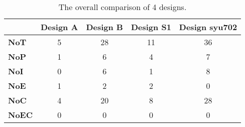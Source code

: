 \begin{table}[H]
	\renewcommand{\arraystretch}{1.3}	
	\caption{The overall comparison of 4 designs.}
	\label{tab:overall}
	\centering
	\begin{tabularx}{\columnwidth}{@{}lcccc@{}}
	\toprule
	\toprule
	& \textbf{Design A} & \textbf{Design B} & \textbf{Design S1} & \textbf{Design syu702} \\ 
	\midrule
	\textbf{NoT}  & 5  & 28 & 11 & 36            \\
	\textbf{NoP}  & 1  & 6  & 4  & 7             \\
	\textbf{NoI}  & 0  & 6  & 1  & 8             \\
	\textbf{NoE}  & 1  & 2  & 2  & 0             \\
	\textbf{NoC}  & 4  & 20 & 8  & 28            \\
	\textbf{NoEC} & 0  & 0  & 0  & 0             \\	
	\bottomrule
	\bottomrule
	\end{tabularx}
\end{table}
